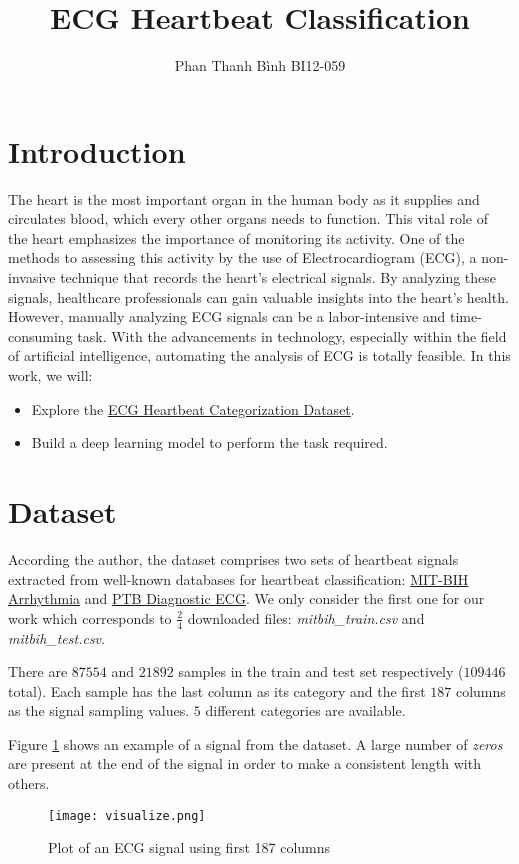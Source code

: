 \documentclass[conference]{IEEEtran}
\title{ECG Heartbeat Classification}
\author{Phan Thanh Bình BI12-059}
\begin{document}
\maketitle

\section{Introduction}
The heart is the most important organ in the human body as it supplies and circulates blood, which every other organs needs to function. This vital role of the heart emphasizes the importance of monitoring its activity. One of the methods to assessing this activity by the use of Electrocardiogram (ECG), a non-invasive technique that records the heart's electrical signals. By analyzing these signals, healthcare professionals can gain valuable insights into the heart's health. However, manually analyzing ECG signals can be a labor-intensive and time-consuming task. With the advancements in technology, especially within the field of artificial intelligence, automating the analysis of ECG is totally feasible. In this work, we will:
\begin{itemize}
    \item Explore the \href{https://www.kaggle.com/datasets/shayanfazeli/heartbeat}{ECG Heartbeat Categorization Dataset}.
    \item Build a deep learning model to perform the task required.
\end{itemize}

\section{Dataset}
According the author, the dataset comprises two sets of heartbeat signals extracted from well-known databases for heartbeat classification: \href{https://www.physionet.org/content/mitdb/1.0.0/}{MIT-BIH Arrhythmia} and \href{https://www.physionet.org/content/ptbdb/1.0.0/}{PTB Diagnostic ECG}. We only consider the first one for our work which corresponds to $\frac{2}{4}$ downloaded files: \emph{mitbih\_train.csv} and \emph{mitbih\_test.csv}.

There are $87554$ and $21892$ samples in the train and test set respectively ($109446$ total). Each sample has the last column as its category and the first $187$ columns as the signal sampling values. $5$ different categories are available.

Figure \ref{fig:vis} shows an example of a signal from the dataset. A large number of \emph{zeros} are present at the end of the signal in order to make a consistent length with others.
\begin{figure}[h]
    \texttt{[image: visualize.png]}
    \caption{Plot of an ECG signal using first 187 columns}
    \label{fig:vis}
\end{figure}
\end{document}
